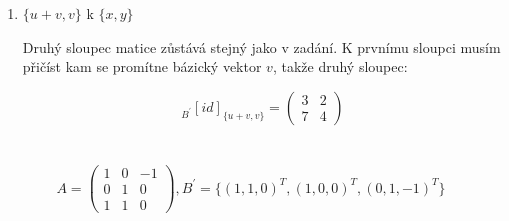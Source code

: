 \documentclass[10pt,a4paper]{article}
\begin{document}
\begin{enumerate}[label=\roman*]
\item $\{u + v, v\}$ k $\{x, y\}$

Druhý sloupec matice zůstává stejný jako v zadání. K prvnímu sloupci musím přičíst kam se promítne bázický vektor $v$, takže druhý sloupec:

\begin{equation*}
{}_{B^\prime}[id]_{\{u + v, v\}} = \begin{pmatrix}
 3 & 2 \\ 7 & 4 
\end{pmatrix}
\end{equation*}

\end{enumerate}
\newpage
\section{}

\begin{equation*}
A = \begin{pmatrix}
1 & 0 & -1 \\ 0 & 1 & 0 \\ 1 & 1 & 0
\end{pmatrix},
B^\prime = \{ (1,1,0)^T, (1,0,0)^T, (0,1,-1)^T\}
\end{equation*}
\end{document}

